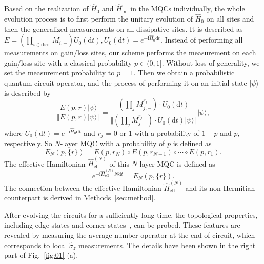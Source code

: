 \documentclass[longbibliography, aps, prx, amsmath, amssymb, amsfonts, twocolumn,superscriptaddress, footinbib]{revtex4-1}
\begin{document}
	Based on the realization of $\hat{H}_0$ and $\hat{H}_{\text{im}}$ in the MQCs individually, the whole evolution process is to first perform the unitary evolution of $\hat{H}_0$ on all sites and then the generalized measurements on all dissipative sites. It is described as $E=(\prod_{i\in \text{dissi}} M_{i,-}) U_{0}(\mathrm{d} t),U_{0}(\mathrm{d}t)=e^{-\mathrm{i}\hat{H}_0 \mathrm{d}t}$.
	Instead of performing all measurements on gain/loss sites, our scheme performs the measurement on each gain/loss site with a classical probability $p\in(0,1]$. 
	Without loss of generality, we set the measurement probability to $p=1$. 
	Then we obtain a probabilistic quantum circuit operator, and the process of performing it on an initial state $\vert \psi \rangle$ is described by
	\begin{equation}
		\frac{E(p,r) \vert \psi \rangle}{\Vert E(p,r) \vert \psi \rangle \Vert} = \frac{(\prod_j M_{j,-}^{r_j}) \cdot U_0(\mathrm{d}t)}{\Vert (\prod_j M_{j,-}^{r_j}) \cdot U_0(\mathrm{d}t) \vert \psi \rangle \Vert} \vert \psi \rangle,
	\end{equation}
	where $U_0(\mathrm{d} t) = e^{-\mathrm{i}\hat{H}_0 \mathrm{d} t}$ and $r_j$ = 0 or 1 with a probability of $1-p$ and $p$, respectively. So $N$-layer MQC with a probability of $p$ is defined as
	\begin{equation}
		E_N(p,\{r\}) = E(p, r_N) \circ E(p, r_{N-1}) \circ \cdots \circ E(p, r_1).
	\end{equation}
	The effective Hamiltonian $\hat{H}_{\text{eff}}^{(N)}$ of this $N$-layer MQC is defined as
	\begin{equation}
		e^{-\mathrm{i}\hat{H}_{\text{eff}}^{(N)} N \mathrm{d} t} = E_N(p,\{r\}). \label{eq:H_scheme1}
	\end{equation}
	The connection between the effective Hamiltonian $\hat{H}_{\text{eff}}^{(N)}$ and its non-Hermitian counterpart is derived in Methods~\ref{sec:method}.

	After evolving the circuits for a sufficiently long time, the topological properties, including edge states and corner states~\cite{zou2021observation,shen2025observation}, can be probed. These features are revealed by measuring the average number operator at the end of circuit, which corresponds to local $\hat{\sigma}_z$ measurements. The details have been shown in the right part of Fig.~\ref{fig:01} (a).
\end{document}
